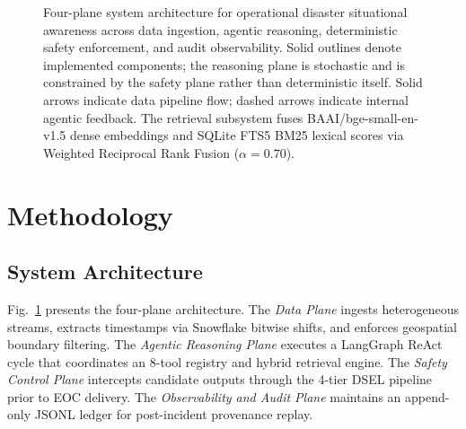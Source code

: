 \documentclass[conference]{IEEEtran}
\begin{document}
\begin{figure}[!t]
{%
}%
\caption{Four-plane system architecture for operational disaster situational awareness across data ingestion, agentic reasoning, deterministic safety enforcement, and audit observability. Solid outlines denote implemented components; the reasoning plane is stochastic and is constrained by the safety plane rather than deterministic itself. Solid arrows indicate data pipeline flow; dashed arrows indicate internal agentic feedback. The retrieval subsystem fuses BAAI/bge-small-en-v1.5 dense embeddings and SQLite FTS5 BM25 lexical scores via Weighted Reciprocal Rank Fusion ($\alpha = 0.70$).}
\label{fig:arch}
\end{figure}

\section{Methodology}

\subsection{System Architecture}
Fig.~\ref{fig:arch} presents the four-plane architecture. The \textit{Data Plane} ingests heterogeneous streams, extracts timestamps via Snowflake bitwise shifts, and enforces geospatial boundary filtering. The \textit{Agentic Reasoning Plane} executes a LangGraph ReAct cycle that coordinates an 8-tool registry and hybrid retrieval engine. The \textit{Safety Control Plane} intercepts candidate outputs through the 4-tier DSEL pipeline prior to EOC delivery. The \textit{Observability and Audit Plane} maintains an append-only JSONL ledger for post-incident provenance replay.
\end{document}
